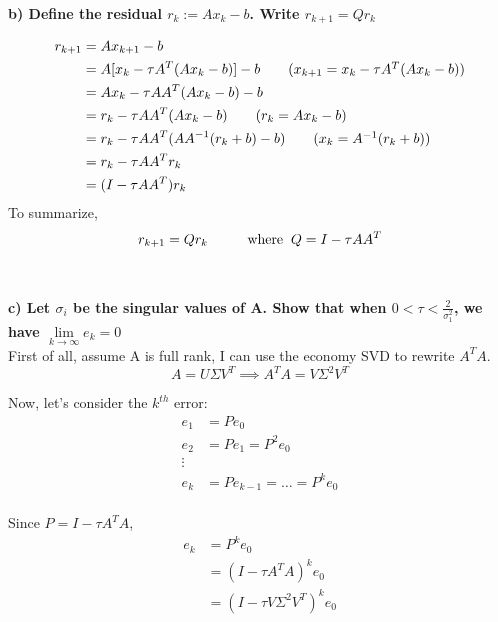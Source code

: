 \documentclass[paper=a4, fontsize=11pt]{scrartcl} %
\numberwithin{equation}{section} %
\numberwithin{figure}{section} %
\numberwithin{table}{section} %
\begin{document}
\newpage
\textbf{b) Define the residual $r_k := A x_k - b$. Write $r_{k+1} = Q r_k$ }

\begin{align*} 
r_{k+1} &= A x_{k+1} - b		\\
&= A [x_k - \tau A^T (A x_k - b)] - b	\tag{$x_{k+1} = x_k - \tau A^T (A x_k - b)$}	\\
&= A x_k - \tau AA^T (A x_k - b) - b		\\
&= r_k - \tau AA^T (A x_k - b) 	 \tag{$r_k = A x_k - b$}	\\
&= r_k - \tau AA^T (A A^{-1}(r_k + b) - b) \tag{$x_k  = A^{-1}(r_k + b)$} \\
&= r_k - \tau AA^T r_k  \\
&= (I - \tau AA^T) r_k  \\
\end{align*}
To summarize, 
$$r_{k+1}= Q r_k \hspace{1cm} \text{where} \hspace{.2cm} Q = I - \tau AA^T$$\\\\









\textbf{c) Let ${\sigma_i}$ be the singular values of A. Show that when $0 < \tau < \frac{2}{\sigma_1^2}$, we have $ \underset{k \to \infty}{\lim} e_k = 0$}\\

First of all, assume A is full rank, I can use the economy SVD to rewrite $A^TA$. 
$$
A = U \Sigma V^T \implies A^TA = V \Sigma^2 V^T
$$

Now, let's consider the $k^{th}$ error: 
\begin{align*} 
e_1 &= P e_0	\\
e_2 &= P e_1	 = P^2 e_0	\\
\vdots \\
e_k &= P e_{k-1} = \dots = P^k e_0 \\
\end{align*} 

Since $P = I - \tau A^T A$, 
\begin{align*} 
e_k & = P^k e_0  \\ 
& = (I - \tau A^T A)^k e_0  \tag{$P = I - \tau A^T A$} \\ 
& = (I - \tau V \Sigma^2 V^T)^k e_0  \tag{$A^TA = V \Sigma^2 V^T$} \\ 
\end{align*} 
\end{document}
